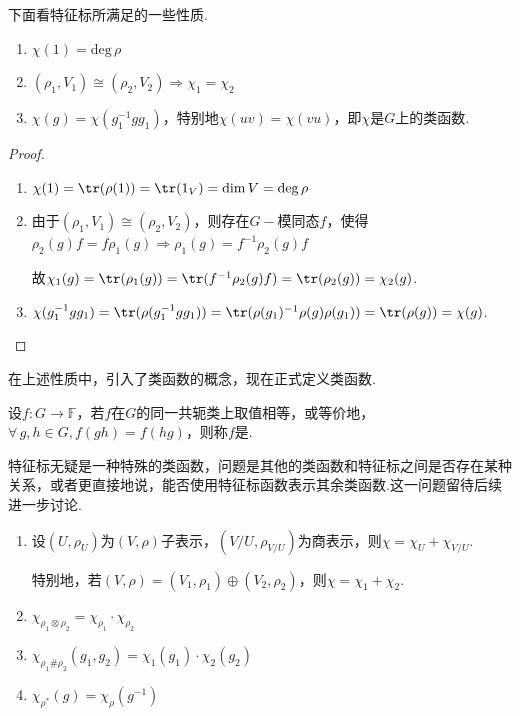 下面看特征标所满足的一些性质.\par

\begin{property}[]
    \begin{enumerate}
        \item[$1^\circ$] $\chi(1)=\mathrm{deg}\,\rho$
        \item[$2^\circ$] $(\rho_1,V_1)\cong(\rho_2,V_2)\Rightarrow \chi_1=\chi_2$
        \item[$3^\circ$] $\chi(g)=\chi(g_1^{-1}gg_1)$，特别地$\chi(uv)=\chi(vu)$，即$\chi$是$G$上的类函数.
    \end{enumerate}
\end{property}

\begin{proof}
    \begin{enumerate}
        \item[$1^\circ$] $\chi(1)=\tr(\rho(1))=\tr(1_V)=\dim V=\mathrm{deg}\,\rho$
        \item[$2^\circ$] 由于$(\rho_1,V_1)\cong(\rho_2,V_2)$，则存在$G-\!$模同态$f$，使得$\rho_2(g)f=f\rho_1(g)\Rightarrow \rho_1(g)=f^{-1}\rho_2(g)f$\par
        故$\chi_1(g)=\tr(\rho_1(g))=\tr(f^{-1}\rho_2(g)f)=\tr(\rho_2(g))=\chi_2(g)$.
        \item[$3^\circ$] $\chi(g_1^{-1}gg_1)=\tr(\rho(g_1^{-1}gg_1))=\tr(\rho(g_1)^{-1}\rho(g)\rho(g_1))=\tr(\rho(g))=\chi(g)$.
    \end{enumerate}
\end{proof}

在上述性质中，引入了类函数的概念，现在正式定义类函数.
\begin{definition}[类函数]
    设$f:G\to \mathbb{F}$，若$f$在$G$的同一共轭类上取值相等，或等价地，$\forall\, g,h\in G, f(gh)=f(hg)$，则称$f$是.
\end{definition}
特征标无疑是一种特殊的类函数，问题是其他的类函数和特征标之间是否存在某种关系，或者更直接地说，能否使用特征标函数表示其余类函数.这一问题留待后续进一步讨论.\par

\begin{property}[]
    \begin{enumerate}
        \item[$4^\circ$] 设$(U,\rho_U)$为$(V,\rho)$子表示，$(V/U,\rho_{V/U})$为商表示，则$\chi=\chi_U+\chi_{V/U}$.\par
        特别地，若$(V,\rho)=(V_1,\rho_1)\oplus(V_2,\rho_2)$，则$\chi=\chi_1+\chi_2$.
        \item[$5^\circ$] $\chi_{\rho_1\otimes\rho_2}=\chi_{\rho_1}\cdot \chi_{\rho_2}$
        \item[$6^\circ$] $\chi_{\rho_1\#\rho_2}(g_1,g_2)=\chi_1(g_1)\cdot\chi_2(g_2)$
        \item[$7^\circ$] $\chi_{\rho^*}(g)=\chi_\rho(g^{-1})$
    \end{enumerate}
\end{property}


